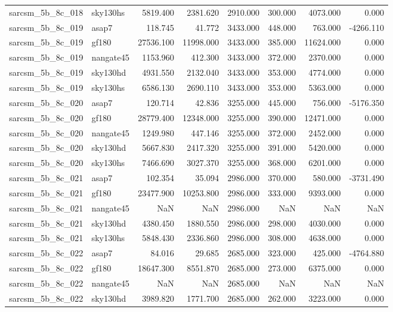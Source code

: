 \begin{tabular}{llrrrrrr}
sarcsm\_5b\_8c\_018 & sky130hs & 5819.400 & 2381.620 & 2910.000 & 300.000 & 4073.000 & 0.000 \\
sarcsm\_5b\_8c\_019 & asap7 & 118.745 & 41.772 & 3433.000 & 448.000 & 763.000 & -4266.110 \\
sarcsm\_5b\_8c\_019 & gf180 & 27536.100 & 11998.000 & 3433.000 & 385.000 & 11624.000 & 0.000 \\
sarcsm\_5b\_8c\_019 & nangate45 & 1153.960 & 412.300 & 3433.000 & 372.000 & 2370.000 & 0.000 \\
sarcsm\_5b\_8c\_019 & sky130hd & 4931.550 & 2132.040 & 3433.000 & 353.000 & 4774.000 & 0.000 \\
sarcsm\_5b\_8c\_019 & sky130hs & 6586.130 & 2690.110 & 3433.000 & 353.000 & 5363.000 & 0.000 \\
sarcsm\_5b\_8c\_020 & asap7 & 120.714 & 42.836 & 3255.000 & 445.000 & 756.000 & -5176.350 \\
sarcsm\_5b\_8c\_020 & gf180 & 28779.400 & 12348.000 & 3255.000 & 390.000 & 12471.000 & 0.000 \\
sarcsm\_5b\_8c\_020 & nangate45 & 1249.980 & 447.146 & 3255.000 & 372.000 & 2452.000 & 0.000 \\
sarcsm\_5b\_8c\_020 & sky130hd & 5667.830 & 2417.320 & 3255.000 & 391.000 & 5420.000 & 0.000 \\
sarcsm\_5b\_8c\_020 & sky130hs & 7466.690 & 3027.370 & 3255.000 & 368.000 & 6201.000 & 0.000 \\
sarcsm\_5b\_8c\_021 & asap7 & 102.354 & 35.094 & 2986.000 & 370.000 & 580.000 & -3731.490 \\
sarcsm\_5b\_8c\_021 & gf180 & 23477.900 & 10253.800 & 2986.000 & 333.000 & 9393.000 & 0.000 \\
sarcsm\_5b\_8c\_021 & nangate45 & NaN & NaN & 2986.000 & NaN & NaN & NaN \\
sarcsm\_5b\_8c\_021 & sky130hd & 4380.450 & 1880.550 & 2986.000 & 298.000 & 4030.000 & 0.000 \\
sarcsm\_5b\_8c\_021 & sky130hs & 5848.430 & 2336.860 & 2986.000 & 308.000 & 4638.000 & 0.000 \\
sarcsm\_5b\_8c\_022 & asap7 & 84.016 & 29.685 & 2685.000 & 323.000 & 425.000 & -4764.880 \\
sarcsm\_5b\_8c\_022 & gf180 & 18647.300 & 8551.870 & 2685.000 & 273.000 & 6375.000 & 0.000 \\
sarcsm\_5b\_8c\_022 & nangate45 & NaN & NaN & 2685.000 & NaN & NaN & NaN \\
sarcsm\_5b\_8c\_022 & sky130hd & 3989.820 & 1771.700 & 2685.000 & 262.000 & 3223.000 & 0.000 \\

\end{tabular}
